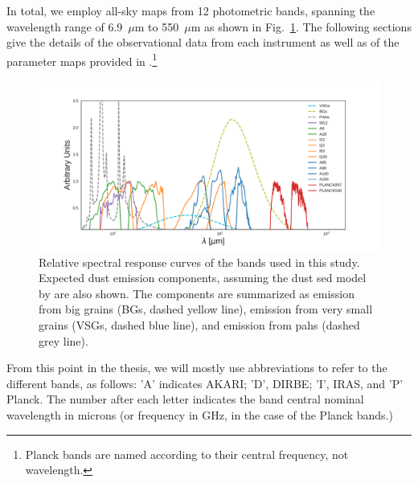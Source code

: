     In total, we employ all-sky maps from 12 photometric bands, spanning the wavelength range of 6.9~$\mu$m to 550~$\mu$m as shown in Fig.~\ref{fig:Filter_coverage_example_full}. The following sections give the details of the observational data from each instrument as well as of the parameter maps provided in \cite{planck15X}.\footnote{Planck bands are named according to their central frequency, not wavelength.}
      \begin{figure}
        \centering
        \includegraphics[width=\textwidth]{../Plots/ch_datasources/Filter_coverage_example_full.pdf}
        \caption{Relative spectral response curves of the bands used in this study. Expected dust emission components, assuming the dust \acrshort{sed} model by \citep{dustem11} are also shown. The components are summarized as emission from big grains (BGs, dashed yellow line), emission from very small grains (VSGs, dashed blue line), and emission from \acrshort{pah}s (dashed grey line).}
        \label{fig:Filter_coverage_example_full}
      \end{figure}
    From this point in the thesis, we will mostly use abbreviations to refer to the different bands, as follows: 'A' indicates AKARI; 'D', DIRBE; 'I', IRAS, and 'P' Planck. The number after each letter indicates the band central nominal wavelength in microns (or frequency in GHz, in the case of the Planck bands.)
